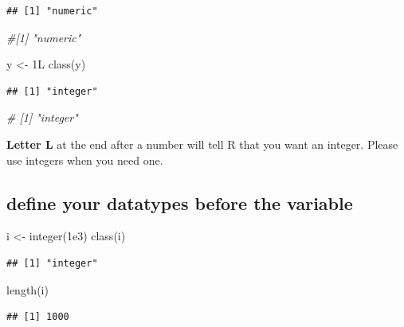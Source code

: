 \documentclass[
]{book}
\newenvironment{Shaded}{\begin{snugshade}}{\end{snugshade}}
\newcommand{\CommentTok}[1]{\textcolor[rgb]{0.56,0.35,0.01}{\textit{#1}}}
\newcommand{\FloatTok}[1]{\textcolor[rgb]{0.00,0.00,0.81}{#1}}
\newcommand{\FunctionTok}[1]{\textcolor[rgb]{0.00,0.00,0.00}{#1}}
\newcommand{\NormalTok}[1]{#1}
\newcommand{\OtherTok}[1]{\textcolor[rgb]{0.56,0.35,0.01}{#1}}
\begin{document}
\begin{verbatim}
## [1] "numeric"
\end{verbatim}

\begin{Shaded}
\begin{Highlighting}[]
\CommentTok{\#[1] "numeric"}

\NormalTok{y }\OtherTok{\textless{}{-}}\NormalTok{ 1L}
\FunctionTok{class}\NormalTok{(y)}
\end{Highlighting}
\end{Shaded}

\begin{verbatim}
## [1] "integer"
\end{verbatim}

\begin{Shaded}
\begin{Highlighting}[]
\CommentTok{\# [1] "integer"}
\end{Highlighting}
\end{Shaded}

\textbf{Letter L} at the end after a number will tell R that you want an integer. Please use integers when you need one.

\hypertarget{define-your-datatypes-before-the-variable}{%
\subsection{define your datatypes before the variable}\label{define-your-datatypes-before-the-variable}}

\begin{Shaded}
\begin{Highlighting}[]
\NormalTok{i }\OtherTok{\textless{}{-}} \FunctionTok{integer}\NormalTok{(}\FloatTok{1e3}\NormalTok{)}
\FunctionTok{class}\NormalTok{(i)}
\end{Highlighting}
\end{Shaded}

\begin{verbatim}
## [1] "integer"
\end{verbatim}

\begin{Shaded}
\begin{Highlighting}[]
\FunctionTok{length}\NormalTok{(i)}
\end{Highlighting}
\end{Shaded}

\begin{verbatim}
## [1] 1000
\end{verbatim}
\end{document}
